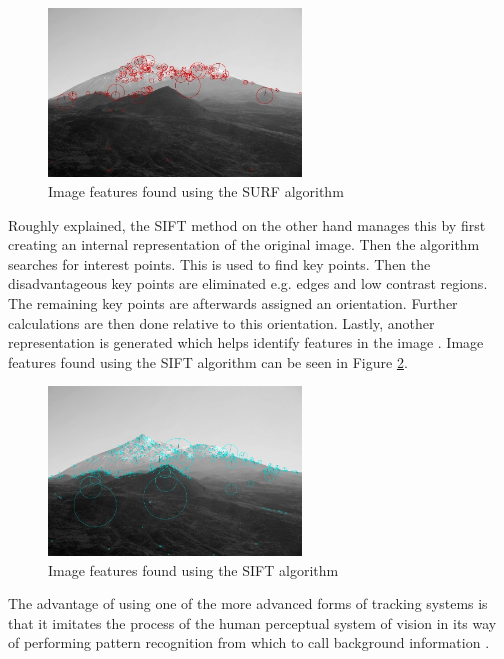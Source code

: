 \begin{figure}[h!]
    \centering
    \includegraphics[width=0.6\textwidth]{figures/SURF.jpg}
    \caption{Image features found using the SURF algorithm \cite{Oyallon2015}}\label{fig:SURF}
\end{figure}

Roughly explained, the SIFT method on the other hand manages this by first creating an internal representation of the original image. Then the algorithm searches for interest points. This is used to find key points. Then the disadvantageous key points are eliminated e.g. edges and low contrast regions. The remaining key points are afterwards assigned an orientation. Further calculations are then done relative to this orientation. Lastly, another representation is generated which helps identify features in the image \cite{Sinha}. Image features found using the SIFT algorithm can be seen in Figure \ref{fig:SIFT}.


\begin{figure}[h!]
    \centering
    \includegraphics[width=0.6\textwidth]{figures/SIFT.jpg}
    \caption{Image features found using the SIFT algorithm \cite{Oyallon2015}}\label{fig:SIFT}
\end{figure}\pagebreak

The advantage of using one of the more advanced forms of tracking systems is that it imitates the process of the human perceptual system of vision in its way of performing pattern recognition from which to call background information \cite{Woodford}.

